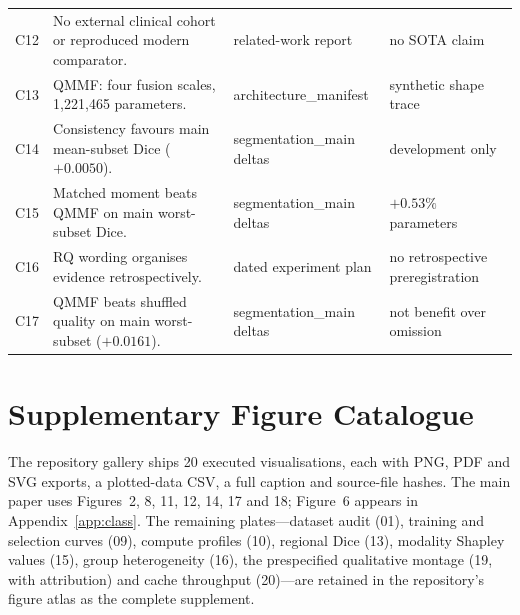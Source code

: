 \begin{table}[tp]
\begin{tabular}{lp{5.6cm}lp{4.2cm}}
C12 & No external clinical cohort or reproduced modern comparator. & related-work report & no SOTA claim \\
C13 & QMMF: four fusion scales, 1{,}221{,}465 parameters. & architecture\_manifest & synthetic shape trace \\
C14 & Consistency favours main mean-subset Dice ($+0.0050$). & segmentation\_main deltas & development only \\
C15 & Matched moment beats QMMF on main worst-subset Dice. & segmentation\_main deltas & $+0.53\%$ parameters \\
C16 & RQ wording organises evidence retrospectively. & dated experiment plan & no retrospective preregistration \\
C17 & QMMF beats shuffled quality on main worst-subset ($+0.0161$). & segmentation\_main deltas & not benefit over omission \\
\bottomrule
\end{tabular}
\end{table}

\section{Supplementary Figure Catalogue}
\label{app:gallery}

The repository gallery ships 20 executed visualisations, each with PNG, PDF and SVG exports, a plotted-data CSV, a full caption and source-file hashes. The main paper uses Figures~2, 8, 11, 12, 14, 17 and 18; Figure~6 appears in Appendix~\ref{app:class}. The remaining plates---dataset audit (01), training and selection curves (09), compute profiles (10), regional Dice (13), modality Shapley values (15), group heterogeneity (16), the prespecified qualitative montage (19, with attribution) and cache throughput (20)---are retained in the repository's figure atlas as the complete supplement.


